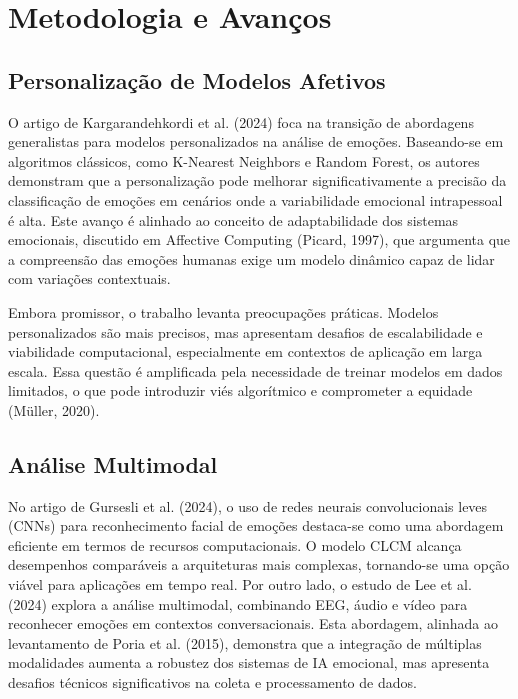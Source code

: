 \documentclass[a4paper,12pt]{report}
\begin{document}
	
	\section{Metodologia e Avanços}
	
	\subsection{Personalização de Modelos Afetivos}
	
	O artigo de Kargarandehkordi et al. (2024) foca na transição de abordagens generalistas para modelos personalizados na análise de emoções. Baseando-se em algoritmos clássicos, como K-Nearest Neighbors e Random Forest, os autores demonstram que a personalização pode melhorar significativamente a precisão da classificação de emoções em cenários onde a variabilidade emocional intrapessoal é alta. Este avanço é alinhado ao conceito de adaptabilidade dos sistemas emocionais, discutido em Affective Computing (Picard, 1997), que argumenta que a compreensão das emoções humanas exige um modelo dinâmico capaz de lidar com variações contextuais.
	
	Embora promissor, o trabalho levanta preocupações práticas. Modelos personalizados são mais precisos, mas apresentam desafios de escalabilidade e viabilidade computacional, especialmente em contextos de aplicação em larga escala. Essa questão é amplificada pela necessidade de treinar modelos em dados limitados, o que pode introduzir viés algorítmico e comprometer a equidade (Müller, 2020).
	
	
	\subsection{Análise Multimodal}
	
	No artigo de Gursesli et al. (2024), o uso de redes neurais convolucionais leves (CNNs) para reconhecimento facial de emoções destaca-se como uma abordagem eficiente em termos de recursos computacionais. O modelo CLCM alcança desempenhos comparáveis a arquiteturas mais complexas, tornando-se uma opção viável para aplicações em tempo real. Por outro lado, o estudo de Lee et al. (2024) explora a análise multimodal, combinando EEG, áudio e vídeo para reconhecer emoções em contextos conversacionais. Esta abordagem, alinhada ao levantamento de Poria et al. (2015), demonstra que a integração de múltiplas modalidades aumenta a robustez dos sistemas de IA emocional, mas apresenta desafios técnicos significativos na coleta e processamento de dados.
	
\end{document}
